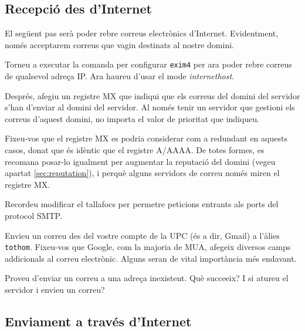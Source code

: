 \documentclass{practicaitic}
\begin{document}
\subsection{Recepció des d'Internet}

El següent pas serà poder rebre correus electrònics d'Internet. Evidentment,
només acceptarem correus que vagin destinats al nostre domini.

\begin{previ}
  Torneu a executar la comanda per configurar \texttt{exim4} per ara poder
  rebre correus de qualsevol adreça IP. Ara haureu d'usar el mode
  \textit{internethost}.

  Després, afegiu un registre MX que indiqui que els correus del domini
  del servidor s'han d'enviar al domini del servidor. Al només tenir un
  servidor que gestioni els correus d'aquest domini, no importa el valor
  de prioritat que indiqueu.

  Fixeu-vos que el registre MX es podria considerar com a redundant en aquests
  casos, donat que és idèntic que el registre A/AAAA. De totes formes, es
  recomana posar-lo igualment per augmentar la reputació del domini
  (vegeu apartat \ref{sec:reputation}), i perquè alguns servidors de
  correu només miren el registre MX.
\end{previ}

Recordeu modificar el tallafocs per permetre peticions entrants als ports
del protocol SMTP.

\begin{tasca}
  Envieu un correu des del vostre compte de la UPC (és a dir, Gmail) a
  l'àlies \texttt{tothom}. Fixeu-vos que Google, com la majoria de
  MUA, afegeix diversos camps addicionals al correu electrònic. Alguns
  seran de vital importància més endavant.

  Proveu d'enviar un correu a una adreça inexistent. Què succeeix? I si
  atureu el servidor i envieu un correu?
\end{tasca}



\subsection{Enviament a través d'Internet}
\end{document}
